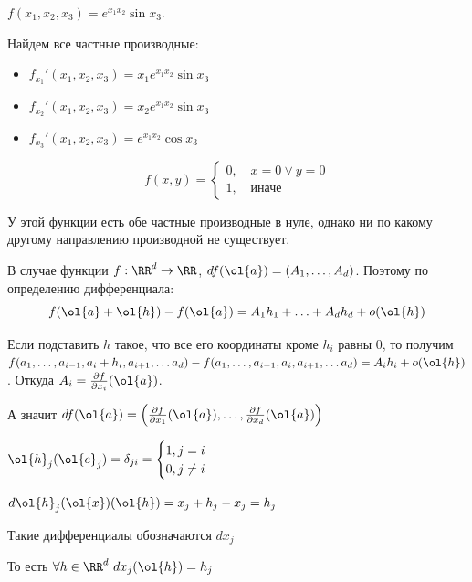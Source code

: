 \begin{example}{}{}
    \( f(x_1, x_2, x_3) = e^{x_1 x_2} \sin x_3 \).

    Найдем все частные производные:
    \begin{itemize}
        \item
            \( f_{x_1}' (x_1, x_2, x_3) = x_1 e^{x_1 x_2} \sin x_3 \)
        \item
            \( f_{x_2}' (x_1, x_2, x_3) = x_2 e^{x_1 x_2} \sin x_3 \)
        \item
            \( f_{x_3}' (x_1, x_2, x_3) = e^{x_1 x_2} \cos x_3 \)
    \end{itemize}
\end{example}

\begin{example}{}{}
    \[
        f(x, y) = \begin{cases}
            0, \quad x = 0 \lor y = 0
            \\
            1, \quad \text{иначе}
        \end{cases}
    \]

    У этой функции есть обе частные производные в нуле,
    однако ни по какому другому направлению производной не существует.
\end{example}

В случае функции \( f : \RR^d \to \RR \),
\( df(\ol{a}) = (A_1, \ldots, A_d) \).
Поэтому по определению дифференциала:
\[
    f(\ol{a} + \ol{h}) - f(\ol{a}) = A_1 h_1 + \ldots + A_d h_d + o(\ol{h})
\]

Если подставить \( h \) такое, что все его координаты кроме \( h_i \) равны \( 0 \),
то получим
\(
    f(a_1, \ldots, a_{i - 1}, a_i + h_i, a_{i + 1}, \ldots a_d) - f(a_1, \ldots, a_{i - 1}, a_i, a_{i + 1}, \ldots a_d)
    =
    A_i h_i + o(\ol{h})
\).
Откуда \( A_i = \frac{\partial f}{\partial x_i} (\ol{a}) \).

А значит \( df(\ol{a}) = \left( \frac{\partial f}{\partial x_1} (\ol{a}), \ldots, \frac{\partial f}{\partial x_d} (\ol{a}) \right) \)

\begin{remark}{}{}
    \(
        \displaystyle
        \ol{h}_j (\ol{e}_j) = \delta_{ji} = \begin{cases}
            1, j = i
            \\
            0, j \neq i
        \end{cases}
    \)

    \(
        d \ol{h}_j (\ol{x}) (\ol{h}) = x_j + h_j - x_j = h_j
    \)

    Такие дифференциалы обозначаются \( dx_j \)

    То есть \( \forall h \in \RR^d \ dx_j (\ol{h}) = h_j \)
\end{remark}

